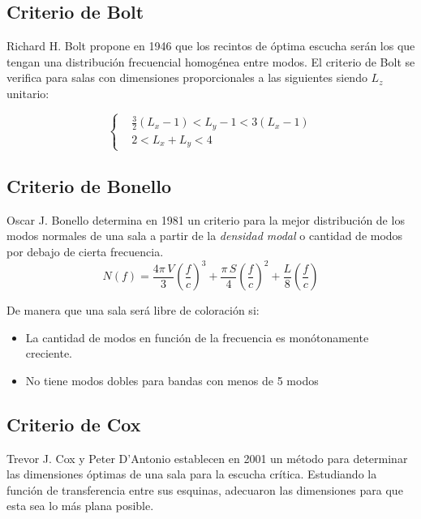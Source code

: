 \documentclass[a5paper,12pt,twoside]{book}
\begin{document}
\subsection{Criterio de Bolt}

Richard H. Bolt propone en 1946 que los recintos de óptima escucha serán los que tengan una distribución frecuencial homogénea entre modos.
El criterio de Bolt se verifica para salas con dimensiones proporcionales a las siguientes siendo $L_z$ unitario:

\begin{equation*}
    \left\{
    \begin{aligned}
        & \frac{3}{2} \left( L_x-1 \right) < L_y -1 < 3 \left( L_x-1 \right)
        \\
        & 2 < L_x+L_y < 4
    \end{aligned}
    \right.
\end{equation*}


\subsection{Criterio de Bonello}

Oscar J. Bonello determina en 1981 un criterio para la mejor distribución de los modos normales de una sala a partir de la \emph{densidad modal} o cantidad de modos por debajo de cierta frecuencia.
\begin{equation*}
    N(f) = \frac{4\pi\,V}{3} \left(\frac{f}{c}\right)^3 + \frac{\pi \, S}{4} \left(\frac{f}{c}\right)^2 + \frac{L}{8} \left(\frac{f}{c}\right)
\end{equation*}

De manera que una sala será libre de coloración si:
\begin{itemize}
    \item La cantidad de modos en función de la frecuencia es monótonamente creciente.
    \item No tiene modos dobles para bandas con menos de 5 modos
\end{itemize} 


\subsection{Criterio de Cox}

Trevor J. Cox y Peter D'Antonio establecen en 2001 un método para determinar las dimensiones óptimas de una sala para la escucha crítica.
Estudiando la función de transferencia entre sus esquinas, adecuaron las dimensiones para que esta sea lo más plana posible.
\end{document}
